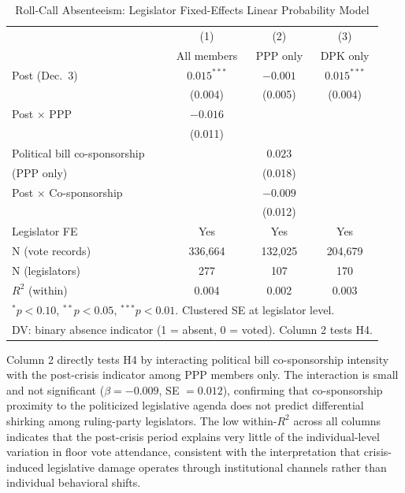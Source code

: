\documentclass[11pt]{article}
\begin{document}
\begin{table}[htbp]
\centering
\caption{Roll-Call Absenteeism: Legislator Fixed-Effects Linear Probability Model}
\label{tab:reg_absence}
\begin{tabular}{lccc}
\toprule
 & (1) & (2) & (3) \\
 & All members & PPP only & DPK only \\
\midrule
Post (Dec.\ 3) & $0.015^{***}$ & $-0.001$ & $0.015^{***}$ \\
 & (0.004) & (0.005) & (0.004) \\
Post $\times$ PPP & $-0.016$ & & \\
 & (0.011) & & \\
Political bill co-sponsorship & & $0.023$ & \\
(PPP only) & & (0.018) & \\
Post $\times$ Co-sponsorship & & $-0.009$ & \\
 & & (0.012) & \\
\midrule
Legislator FE & Yes & Yes & Yes \\
N (vote records) & 336,664 & 132,025 & 204,679 \\
N (legislators) & 277 & 107 & 170 \\
$R^2$ (within) & 0.004 & 0.002 & 0.003 \\
\bottomrule
\multicolumn{4}{l}{\footnotesize $^{*}p<0.10$, $^{**}p<0.05$, $^{***}p<0.01$. Clustered SE at legislator level.} \\
\multicolumn{4}{l}{\footnotesize DV: binary absence indicator (1 = absent, 0 = voted). Column 2 tests H4.}
\end{tabular}
\end{table}

Column 2 directly tests H4 by interacting political bill co-sponsorship intensity with the post-crisis indicator among PPP members only. The interaction is small and not significant ($\beta = -0.009$, SE $= 0.012$), confirming that co-sponsorship proximity to the politicized legislative agenda does not predict differential shirking among ruling-party legislators. The low within-$R^2$ across all columns indicates that the post-crisis period explains very little of the individual-level variation in floor vote attendance, consistent with the interpretation that crisis-induced legislative damage operates through institutional channels rather than individual behavioral shifts.
\end{document}
